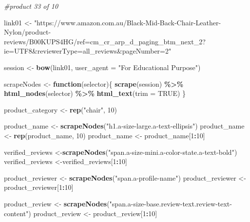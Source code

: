 \documentclass[
]{article}
\newenvironment{Shaded}{\begin{snugshade}}{\end{snugshade}}
\newcommand{\AttributeTok}[1]{\textcolor[rgb]{0.13,0.29,0.53}{#1}}
\newcommand{\CommentTok}[1]{\textcolor[rgb]{0.56,0.35,0.01}{\textit{#1}}}
\newcommand{\ConstantTok}[1]{\textcolor[rgb]{0.56,0.35,0.01}{#1}}
\newcommand{\ControlFlowTok}[1]{\textcolor[rgb]{0.13,0.29,0.53}{\textbf{#1}}}
\newcommand{\DecValTok}[1]{\textcolor[rgb]{0.00,0.00,0.81}{#1}}
\newcommand{\FunctionTok}[1]{\textcolor[rgb]{0.13,0.29,0.53}{\textbf{#1}}}
\newcommand{\NormalTok}[1]{#1}
\newcommand{\OtherTok}[1]{\textcolor[rgb]{0.56,0.35,0.01}{#1}}
\newcommand{\SpecialCharTok}[1]{\textcolor[rgb]{0.81,0.36,0.00}{\textbf{#1}}}
\newcommand{\StringTok}[1]{\textcolor[rgb]{0.31,0.60,0.02}{#1}}
\begin{document}
\begin{Shaded}
\begin{Highlighting}[]
\CommentTok{\#product 33 of 10}

\NormalTok{link01 }\OtherTok{\textless{}{-}} \StringTok{"https://www.amazon.com.au/Black{-}Mid{-}Back{-}Chair{-}Leather{-}Nylon/product{-}reviews/B00KUPS4HG/ref=cm\_cr\_arp\_d\_paging\_btm\_next\_2?ie=UTF8\&reviewerType=all\_reviews\&pageNumber=2"}


\NormalTok{  session }\OtherTok{\textless{}{-}} \FunctionTok{bow}\NormalTok{(link01,}
               \AttributeTok{user\_agent =} \StringTok{"For Educational Purpose"}\NormalTok{)}

\NormalTok{  scrapeNodes }\OtherTok{\textless{}{-}} \ControlFlowTok{function}\NormalTok{(selector)\{}
    \FunctionTok{scrape}\NormalTok{(session) }\SpecialCharTok{\%\textgreater{}\%}
      \FunctionTok{html\_nodes}\NormalTok{(selector) }\SpecialCharTok{\%\textgreater{}\%}
      \FunctionTok{html\_text}\NormalTok{(}\AttributeTok{trim =} \ConstantTok{TRUE}\NormalTok{)}
\NormalTok{  \}}

\NormalTok{  product\_category }\OtherTok{\textless{}{-}} \FunctionTok{rep}\NormalTok{(}\StringTok{"chair"}\NormalTok{, }\DecValTok{10}\NormalTok{)}

\NormalTok{  product\_name }\OtherTok{\textless{}{-}} \FunctionTok{scrapeNodes}\NormalTok{(}\StringTok{"h1.a{-}size{-}large.a{-}text{-}ellipsis"}\NormalTok{)}
\NormalTok{  product\_name }\OtherTok{\textless{}{-}} \FunctionTok{rep}\NormalTok{(product\_name, }\DecValTok{10}\NormalTok{)}
\NormalTok{  product\_name }\OtherTok{\textless{}{-}}\NormalTok{ product\_name[}\DecValTok{1}\SpecialCharTok{:}\DecValTok{10}\NormalTok{]}
  
\NormalTok{  verified\_reviews }\OtherTok{\textless{}{-}}\FunctionTok{scrapeNodes}\NormalTok{(}\StringTok{"span.a{-}size{-}mini.a{-}color{-}state.a{-}text{-}bold"}\NormalTok{)}
\NormalTok{  verified\_reviews }\OtherTok{\textless{}{-}}\NormalTok{verified\_reviews[}\DecValTok{1}\SpecialCharTok{:}\DecValTok{10}\NormalTok{]}
  
\NormalTok{  product\_reviewer }\OtherTok{\textless{}{-}} \FunctionTok{scrapeNodes}\NormalTok{(}\StringTok{"span.a{-}profile{-}name"}\NormalTok{)}
\NormalTok{  product\_reviewer }\OtherTok{\textless{}{-}}\NormalTok{ product\_reviewer[}\DecValTok{1}\SpecialCharTok{:}\DecValTok{10}\NormalTok{]}
  
\NormalTok{  product\_review }\OtherTok{\textless{}{-}} \FunctionTok{scrapeNodes}\NormalTok{(}\StringTok{"span.a{-}size{-}base.review{-}text.review{-}text{-}content"}\NormalTok{)}
\NormalTok{  product\_review }\OtherTok{\textless{}{-}}\NormalTok{ product\_review[}\DecValTok{1}\SpecialCharTok{:}\DecValTok{10}\NormalTok{]}
  

\end{Highlighting}
\end{Shaded}
\end{document}
